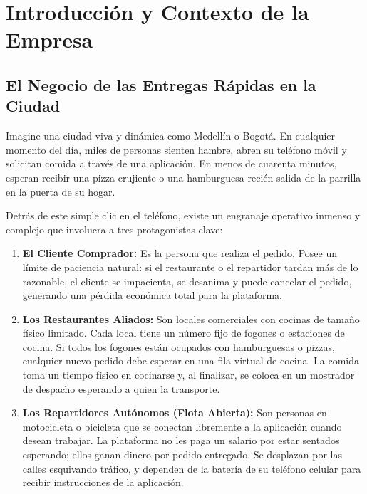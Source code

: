 \documentclass[11pt,a4paper]{article}
\begin{document}
\tableofcontents
\newpage

\section{Introducción y Contexto de la Empresa}

\subsection{El Negocio de las Entregas Rápidas en la Ciudad}
Imagine una ciudad viva y dinámica como Medellín o Bogotá. En cualquier momento del día, miles de personas sienten hambre, abren su teléfono móvil y solicitan comida a través de una aplicación. En menos de cuarenta minutos, esperan recibir una pizza crujiente o una hamburguesa recién salida de la parrilla en la puerta de su hogar.

Detrás de este simple clic en el teléfono, existe un engranaje operativo inmenso y complejo que involucra a tres protagonistas clave:
\begin{enumerate}[label=\textbf{\arabic*.}]
    \item \textbf{El Cliente Comprador:} Es la persona que realiza el pedido. Posee un límite de paciencia natural: si el restaurante o el repartidor tardan más de lo razonable, el cliente se impacienta, se desanima y puede cancelar el pedido, generando una pérdida económica total para la plataforma.
    \item \textbf{Los Restaurantes Aliados:} Son locales comerciales con cocinas de tamaño físico limitado. Cada local tiene un número fijo de fogones o estaciones de cocina. Si todos los fogones están ocupados con hamburguesas o pizzas, cualquier nuevo pedido debe esperar en una fila virtual de cocina. La comida toma un tiempo físico en cocinarse y, al finalizar, se coloca en un mostrador de despacho esperando a quien la transporte.
    \item \textbf{Los Repartidores Autónomos (Flota Abierta):} Son personas en motocicleta o bicicleta que se conectan libremente a la aplicación cuando desean trabajar. La plataforma no les paga un salario por estar sentados esperando; ellos ganan dinero por pedido entregado. Se desplazan por las calles esquivando tráfico, y dependen de la batería de su teléfono celular para recibir instrucciones de la aplicación.
\end{enumerate}
\end{document}
